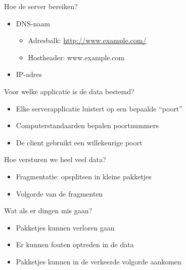 


\begin{frame}{Hoe de server bereiken?}
\begin{itemize}
\item<1-> DNS-naam
    \begin{itemize}
    \item Adresbalk: \url{http://www.example.com/}
    \item Hostheader: www.example.com
    \end{itemize}
\item<2-> IP-adres
\end{itemize}
\end{frame}



\begin{frame}{Voor welke applicatie is de data bestemd?}
\begin{itemize}[<+->]
\item Elke serverapplicatie luistert op een bepaalde ``poort''
\item Computerstandaarden bepalen poortnummers
\item De client gebruikt een willekeurige poort
\end{itemize}
\end{frame}



\begin{frame}{Hoe versturen we heel veel data?}
\begin{itemize}[<+->]
\item Fragmentatie: opsplitsen in kleine pakketjes
\item Volgorde van de fragmenten
\end{itemize}
\end{frame}



\begin{frame}{Wat als er dingen mis gaan?}
\begin{itemize}[<+->]
\item Pakketjes kunnen verloren gaan
\item Er kunnen fouten optreden in de data
\item Pakketjes kunnen in de verkeerde volgorde aankomen
\end{itemize}
\end{frame}




